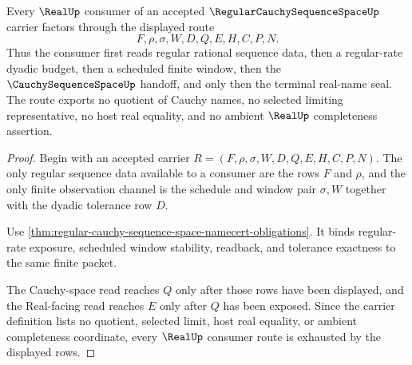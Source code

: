 \begin{theorem}
\label{thm:regular-cauchy-sequence-space-real-handoff}
Every $\RealUp$ consumer of an accepted $\RegularCauchySequenceSpaceUp$ carrier factors through the displayed route
$$
F,\rho,\sigma,W,D,Q,E,H,C,P,N.
$$
Thus the consumer first reads regular rational sequence data, then a regular-rate dyadic budget, then a scheduled finite window, then the $\CauchySequenceSpaceUp$ handoff, and only then the terminal real-name seal. The route exports no quotient of Cauchy names, no selected limiting representative, no host real equality, and no ambient $\RealUp$ completeness assertion.
\end{theorem}
\begin{proof}
Begin with an accepted carrier $R=(F,\rho,\sigma,W,D,Q,E,H,C,P,N)$. The only regular sequence data available to a consumer are the rows $F$ and $\rho$, and the only finite observation channel is the schedule and window pair $\sigma,W$ together with the dyadic tolerance row $D$.

Use \autoref{thm:regular-cauchy-sequence-space-namecert-obligations}. It binds regular-rate exposure, scheduled window stability, readback, and tolerance exactness to the same finite packet.

The Cauchy-space read reaches $Q$ only after those rows have been displayed, and the Real-facing read reaches $E$ only after $Q$ has been exposed. Since the carrier definition lists no quotient, selected limit, host real equality, or ambient completeness coordinate, every $\RealUp$ consumer route is exhausted by the displayed rows.
\end{proof}

